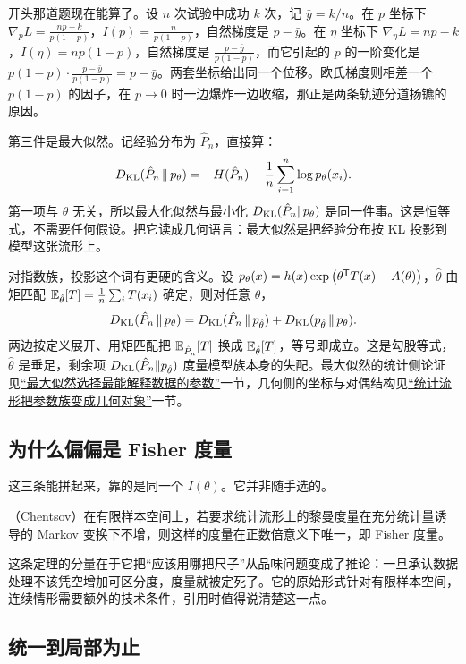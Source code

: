 开头那道题现在能算了。设 \(n\) 次试验中成功 \(k\) 次，记 \(\bar y=k/n\)。在 \(p\) 坐标下 \(\nabla_p L=\frac{np-k}{p(1-p)}\)，\(I(p)=\frac{n}{p(1-p)}\)，自然梯度是 \(p-\bar y\)。在 \(\eta\) 坐标下 \(\nabla_\eta L=np-k\)，\(I(\eta)=np(1-p)\)，自然梯度是 \(\frac{p-\bar y}{p(1-p)}\)，而它引起的 \(p\) 的一阶变化是 \(p(1-p)\cdot\frac{p-\bar y}{p(1-p)}=p-\bar y\)。两套坐标给出同一个位移。欧氏梯度则相差一个 \(p(1-p)\) 的因子，在 \(p\to0\) 时一边爆炸一边收缩，那正是两条轨迹分道扬镳的原因。

第三件是最大似然。记经验分布为 \(\hat P_n\)，直接算：
\[
D_{\mathrm{KL}}(\hat P_n\,\|\,p_\theta)=-H(\hat P_n)-\frac1n\sum_{i=1}^n\log p_\theta(x_i).
\]
第一项与 \(\theta\) 无关，所以最大化似然与最小化 \(D_{\mathrm{KL}}(\hat P_n\|p_\theta)\) 是同一件事。这是恒等式，不需要任何假设。把它读成几何语言：最大似然是把经验分布按 KL 投影到模型这张流形上。

对指数族，投影这个词有更硬的含义。设 \(p_\theta(x)=h(x)\exp\big(\theta^{\mathsf{T}}T(x)-A(\theta)\big)\)，\(\hat\theta\) 由矩匹配 \(\mathbb{E}_{\hat\theta}[T]=\frac1n\sum_i T(x_i)\) 确定，则对任意 \(\theta\)，
\[
D_{\mathrm{KL}}(\hat P_n\,\|\,p_\theta)=D_{\mathrm{KL}}(\hat P_n\,\|\,p_{\hat\theta})+D_{\mathrm{KL}}(p_{\hat\theta}\,\|\,p_\theta).
\]
两边按定义展开、用矩匹配把 \(\mathbb{E}_{\hat P_n}[T]\) 换成 \(\mathbb{E}_{\hat\theta}[T]\)，等号即成立。这是勾股等式，\(\hat\theta\) 是垂足，剩余项 \(D_{\mathrm{KL}}(\hat P_n\|p_{\hat\theta})\) 度量模型族本身的失配。最大似然的统计侧论证见\hyperref[sec:11-Mathematical-Statistics/02-Point-Estimation/03]{``最大似然选择最能解释数据的参数''}一节，几何侧的坐标与对偶结构见\hyperref[sec:12-Real-Analysis-Support/09-Information-Geometry/01]{``统计流形把参数族变成几何对象''}一节。

\subsection{为什么偏偏是 Fisher 度量}

这三条能拼起来，靠的是同一个 \(I(\theta)\)。它并非随手选的。

\begin{theorem}
（Chentsov）在有限样本空间上，若要求统计流形上的黎曼度量在充分统计量诱导的 Markov 变换下不增，则这样的度量在正数倍意义下唯一，即 Fisher 度量。
\end{theorem}

这条定理的分量在于它把``应该用哪把尺子''从品味问题变成了推论：一旦承认数据处理不该凭空增加可区分度，度量就被定死了。它的原始形式针对有限样本空间，连续情形需要额外的技术条件，引用时值得说清楚这一点。

\subsection{统一到局部为止}

